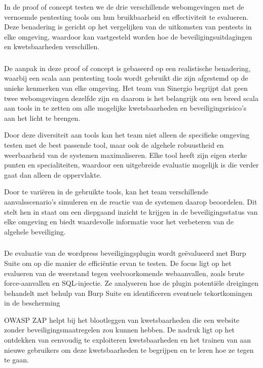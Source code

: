 In de proof of concept testen we de drie verschillende webomgevingen met de vernoemde pentesting tools om hun bruikbaarheid en effectiviteit te evalueren. 
Deze benadering is gericht op het vergelijken van de uitkomsten van pentests in elke omgeving, waardoor kan vastgesteld worden hoe de 
beveiligingsuitdagingen en kwetsbaarheden verschillen.

\subsubsection{}
De aanpak in deze proof of concept is gebaseerd op een realistische benadering, waarbij een scala aan pentesting tools wordt gebruikt die zijn afgestemd 
op de unieke kenmerken van elke omgeving. Het team van Sinergio begrijpt dat geen twee webomgevingen dezelfde zijn en daarom is het belangrijk om een breed scala 
aan tools in te zetten om alle mogelijke kwetsbaarheden en beveiligingsrisico's aan het licht te brengen.

Door deze diversiteit aan tools kan het team niet alleen de specifieke omgeving testen met de best passende tool, maar ook de algehele robuustheid en 
weerbaarheid van de systemen maximaliseren. Elke tool heeft zijn eigen sterke punten en specialiteiten, waardoor een uitgebreide evaluatie mogelijk 
is die verder gaat dan alleen de oppervlakte.

Door te variëren in de gebruikte tools, kan het team verschillende aanvalsscenario's simuleren en de reactie van de systemen daarop beoordelen. Dit 
stelt hen in staat om een diepgaand inzicht te krijgen in de beveiligingsstatus van elke omgeving en biedt waardevolle informatie voor het verbeteren 
van de algehele beveiliging.

\subsubsection{}
De evaluatie van de wordpress beveiligingsplugin wordt geëvalueerd met Burp Suite om op die manier de efficiëntie ervan te testen. De focus ligt op het evalueren van de weerstand 
tegen veelvoorkomende webaanvallen, zoals brute force-aanvallen en SQL-injectie. Ze analyseren hoe de plugin potentiële dreigingen behandelt met 
behulp van Burp Suite en identificeren eventuele tekortkomingen in de bescherming

OWASP ZAP helpt bij het blootleggen van kwetsbaarheden die een website zonder beveiligingsmaatregelen zou kunnen hebben. De nadruk ligt op het 
ontdekken van eenvoudig te exploiteren kwetsbaarheden en het trainen van aan nieuwe gebruikers om deze kwetsbaarheden te begrijpen en 
te leren hoe ze tegen te gaan.

